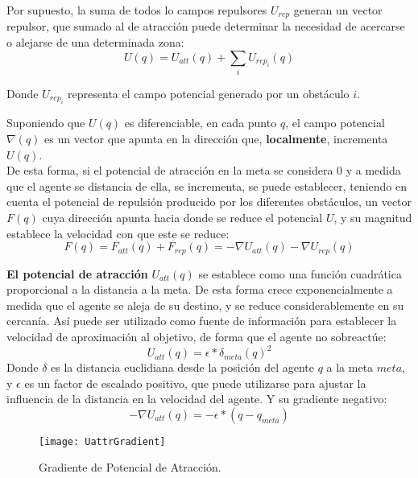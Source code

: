 Por supuesto, la suma de todos lo campos repulsores $U_{rep}$ generan un vector repulsor, que sumado al de atracción puede determinar la necesidad de acercarse o alejarse de una determinada zona:
\begin{equation}
U(q) = U_{att}(q) + \sum_i{U_{rep_i}(q)}
\label{equation:UqTotal}
\end{equation}

Donde $U_{rep_i}$ representa el campo potencial generado por un obstáculo $i$.

Suponiendo que $U(q)$ es diferenciable, en cada punto $q$, el campo potencial $\nabla(q)$ es un vector que apunta en la dirección que, \textbf{localmente}, incrementa $U(q)$. \\De esta forma, si el potencial de atracción en la meta se considera 0 y a medida que el agente se distancia de ella, se incrementa, se puede establecer, teniendo en cuenta el potencial de repulsión producido por los diferentes obstáculos, un vector $F(q)$ cuya dirección apunta hacia donde se reduce el potencial $U$, y su magnitud establece la velocidad con que este se reduce:
\begin{equation}
F(q) = F_{att}(q) + F_{rep}(q) = -\nabla U_{att}(q) - \nabla U_{rep}(q)
\label{equation:Fq}
\end{equation}


\textbf{El potencial de atracción} $U_{att}(q)$ se establece como una función cuadrática proporcional a la distancia a la meta. De esta forma crece exponencialmente a medida que el agente se aleja de su destino, y se reduce considerablemente en su cercanía. Así puede ser utilizado como fuente de información para establecer la velocidad de aproximación al objetivo, de forma que el agente no sobreactúe:
\begin{equation}
U_{att}(q) = \epsilon * \delta_{meta}(q)^2
\label{equation:Uatt}
\end{equation}
Donde $\delta$ es la distancia euclidiana desde la posición del agente $q$ a la meta $meta$, y $\epsilon$ es un factor de escalado positivo, que puede utilizarse para ajustar la influencia de la distancia en la velocidad del agente. Y su gradiente negativo: 
\begin{equation}
-\nabla U_{att}(q) = -\epsilon * (q - q_{meta})
\label{equation:dUatt}
\end{equation}
\begin{figure}[H]
	\centering
	\texttt{[image: UattrGradient]}
	\caption{Gradiente de Potencial de Atracción.}\label{fig:uattrgrad}
\end{figure}

